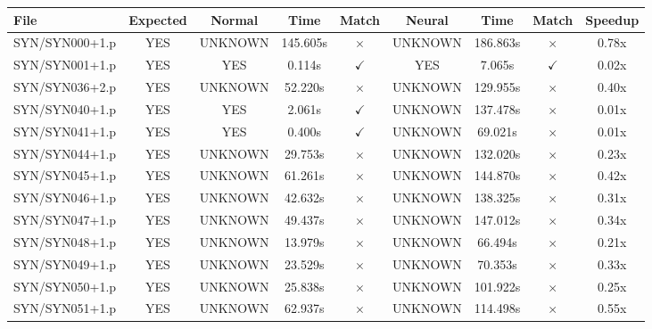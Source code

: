 \documentclass[a4paper,10pt]{article}
\begin{document}
\begin{longtable}{lcccccccc}
\toprule
\textbf{File} & \textbf{Expected} & \textbf{Normal} & \textbf{Time} & \textbf{Match} & \textbf{Neural} & \textbf{Time} & \textbf{Match} & \textbf{Speedup} \\
\midrule
\endhead
SYN/SYN000+1.p & YES & UNKNOWN & 145.605s & \cellcolor{mismatchcolor}$\times$ & UNKNOWN & 186.863s & \cellcolor{mismatchcolor}$\times$ & 0.78x \\
SYN/SYN001+1.p & YES & YES & 0.114s & \cellcolor{matchcolor}$\checkmark$ & YES & 7.065s & \cellcolor{matchcolor}$\checkmark$ & 0.02x \\
SYN/SYN036+2.p & YES & UNKNOWN & 52.220s & \cellcolor{mismatchcolor}$\times$ & UNKNOWN & 129.955s & \cellcolor{mismatchcolor}$\times$ & 0.40x \\
SYN/SYN040+1.p & YES & YES & 2.061s & \cellcolor{matchcolor}$\checkmark$ & UNKNOWN & 137.478s & \cellcolor{mismatchcolor}$\times$ & 0.01x \\
SYN/SYN041+1.p & YES & YES & 0.400s & \cellcolor{matchcolor}$\checkmark$ & UNKNOWN & 69.021s & \cellcolor{mismatchcolor}$\times$ & 0.01x \\
SYN/SYN044+1.p & YES & UNKNOWN & 29.753s & \cellcolor{mismatchcolor}$\times$ & UNKNOWN & 132.020s & \cellcolor{mismatchcolor}$\times$ & 0.23x \\
SYN/SYN045+1.p & YES & UNKNOWN & 61.261s & \cellcolor{mismatchcolor}$\times$ & UNKNOWN & 144.870s & \cellcolor{mismatchcolor}$\times$ & 0.42x \\
SYN/SYN046+1.p & YES & UNKNOWN & 42.632s & \cellcolor{mismatchcolor}$\times$ & UNKNOWN & 138.325s & \cellcolor{mismatchcolor}$\times$ & 0.31x \\
SYN/SYN047+1.p & YES & UNKNOWN & 49.437s & \cellcolor{mismatchcolor}$\times$ & UNKNOWN & 147.012s & \cellcolor{mismatchcolor}$\times$ & 0.34x \\
SYN/SYN048+1.p & YES & UNKNOWN & 13.979s & \cellcolor{mismatchcolor}$\times$ & UNKNOWN & 66.494s & \cellcolor{mismatchcolor}$\times$ & 0.21x \\
SYN/SYN049+1.p & YES & UNKNOWN & 23.529s & \cellcolor{mismatchcolor}$\times$ & UNKNOWN & 70.353s & \cellcolor{mismatchcolor}$\times$ & 0.33x \\
SYN/SYN050+1.p & YES & UNKNOWN & 25.838s & \cellcolor{mismatchcolor}$\times$ & UNKNOWN & 101.922s & \cellcolor{mismatchcolor}$\times$ & 0.25x \\
SYN/SYN051+1.p & YES & UNKNOWN & 62.937s & \cellcolor{mismatchcolor}$\times$ & UNKNOWN & 114.498s & \cellcolor{mismatchcolor}$\times$ & 0.55x \\

\end{longtable}
\end{document}
